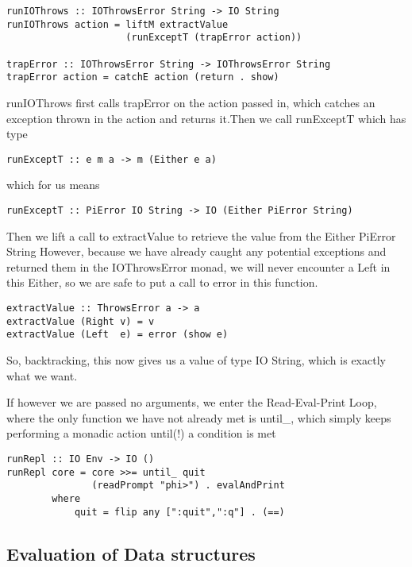 \begin{verbatim}
runIOThrows :: IOThrowsError String -> IO String
runIOThrows action = liftM extractValue 
                     (runExceptT (trapError action))

trapError :: IOThrowsError String -> IOThrowsError String
trapError action = catchE action (return . show)
\end{verbatim}

runIOThrows first calls trapError on the action passed in, which catches an exception thrown in the action and returns it.Then we call runExceptT which has type

\begin{verbatim}
runExceptT :: e m a -> m (Either e a)
\end{verbatim}

which for us means

\begin{verbatim}
runExceptT :: PiError IO String -> IO (Either PiError String)
\end{verbatim}

Then we lift a call to extractValue to retrieve the value from the Either PiError String
However, because we have already caught any potential exceptions and returned them in the IOThrowsError monad, we will never encounter a Left in this Either, so we are safe to put a call to error in this function. 

\begin{verbatim}
extractValue :: ThrowsError a -> a 
extractValue (Right v) = v
extractValue (Left  e) = error (show e)
\end{verbatim}

So, backtracking, this now gives us a value of type IO String, which is exactly what we want. 

If however we are passed no arguments, we enter the Read-Eval-Print Loop, where the only function we have not already met is until_, which simply keeps performing a monadic action until(!) a condition is met

\begin{verbatim}
runRepl :: IO Env -> IO ()
runRepl core = core >>= until_ quit 
               (readPrompt "phi>") . evalAndPrint
        where
            quit = flip any [":quit",":q"] . (==)
\end{verbatim}

\subsection{Evaluation of Data structures}
\label{sec:eval}

